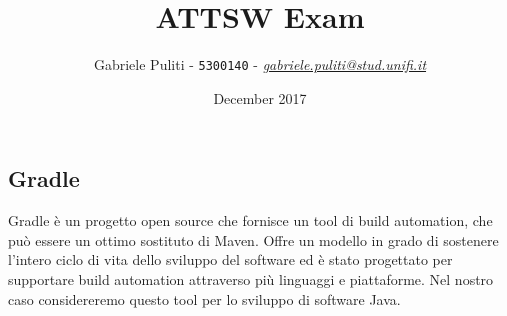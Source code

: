 \documentclass{article}
\title{ATTSW Exam}
\author{Gabriele Puliti - \texttt{5300140} - \href{mailto:gabriele.puliti@stud.unifi.it}{\textit{gabriele.puliti@stud.unifi.it}}}
\date{December 2017}
\begin{document}
\maketitle

\begin{flushleft}


\section{Gradle} %
Gradle è un progetto open source che fornisce un tool di build automation, che può essere un ottimo sostituto di Maven. Offre un modello in grado di sostenere l'intero ciclo di vita dello sviluppo del software ed è stato progettato per supportare build automation attraverso più linguaggi e piattaforme. Nel nostro caso considereremo questo tool per lo sviluppo di software Java.



\end{flushleft}
\end{document}
